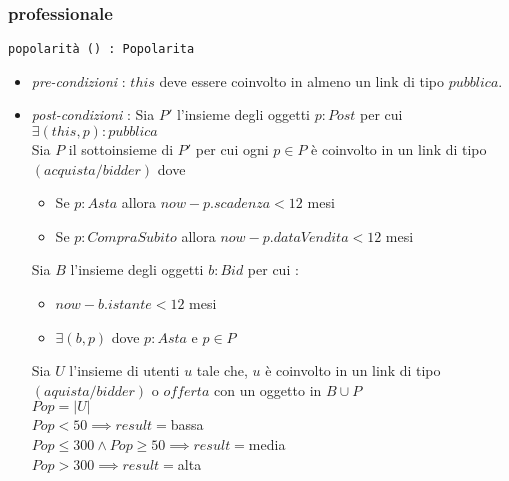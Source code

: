 \documentclass[12pt, letterpaper]{article}
\newcommand{\code}[1]{\colorbox{light-gray}{\texttt{#1}}}
\begin{document}
\subsubsection{professionale}
\code{popolarità () : Popolarita}\begin{itemize}
    \item \textit{pre-condizioni} : $this$ deve essere coinvolto in almeno un link di tipo $pubblica$.
    \item \textit{post-condizioni} : Sia $P'$ l'insieme degli oggetti $p:Post$ per cui $\exists (this,p):pubblica$\\
            Sia $P$ il sottoinsieme di $P'$ per cui ogni $p\in P$ è coinvolto in un link di tipo $(acquista/bidder)$ dove 
            \begin{itemize}
                \item Se $p:Asta$ allora $now - p.scadenza < 12$ mesi 
                \item Se $p:CompraSubito$ allora $now - p.dataVendita < 12$ mesi 
            \end{itemize}
            
            Sia $B$ l'insieme degli oggetti $b:Bid$ per cui : \begin{itemize}
                \item $now - b.istante < 12$ mesi 
                \item $\exists (b,p)$ dove $p:Asta$ e $p\in P$
            \end{itemize}
            Sia $U$ l'insieme di utenti $u$ tale che, $u$ è coinvolto in un link di tipo $(aquista/bidder)$ o $offerta$ con un 
            oggetto in $B\cup P$\\
            $Pop = |U|$\\
            $Pop<50\implies result = $bassa \\
            $Pop\le300\land Pop\ge50\implies result = $media\\ 
            $Pop>300\implies result =$alta
\end{itemize}
\end{document}

